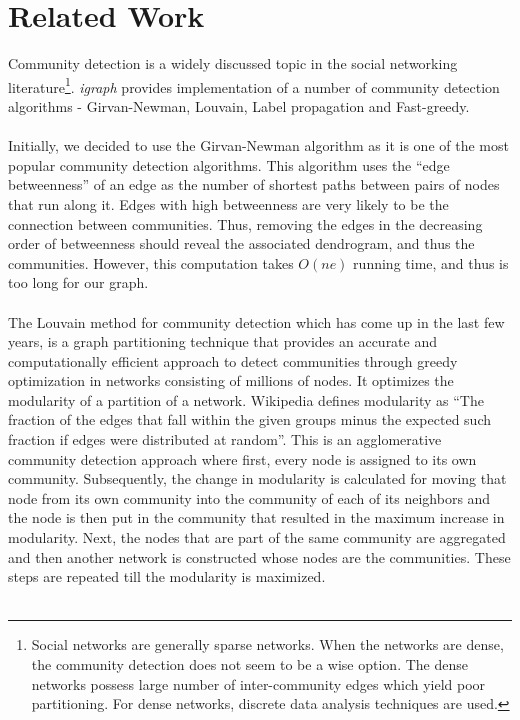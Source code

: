 \documentclass[11pt]{article}
\begin{document}
\section{Related Work}
Community detection is a widely discussed topic in the social networking literature\footnote{Social networks are generally sparse networks. When the networks are dense, the community detection does not seem to be a wise option. The dense networks possess large number of inter-community edges which yield poor partitioning. For dense networks, discrete data analysis techniques are used.}\cite{survey}. {\it igraph}\cite{igraph} provides implementation of a number of community detection algorithms\cite{r-bloggers} - Girvan-Newman, Louvain, Label propagation and Fast-greedy.\\\\
Initially, we decided to use the Girvan-Newman algorithm as it is one of the most popular community detection algorithms\cite{girvan}. This algorithm uses the ``edge betweenness'' of an edge as the number of shortest paths between pairs of nodes that run along it. Edges with high betweenness are very likely to be the connection between communities.
Thus, removing the edges in the decreasing order of betweenness should reveal the associated dendrogram, and thus the communities. However, this computation takes $O(ne)$ running time, and thus is too long for our graph.\\\\
The Louvain\cite{louvain} method for community detection which has come up in the last few years, is a graph partitioning technique that provides an accurate and computationally efficient approach to detect communities through greedy optimization in networks consisting of millions of nodes. It optimizes the modularity of a partition of a network. Wikipedia defines modularity as ``The fraction of the edges that fall within the given groups minus the expected such fraction if edges were distributed at random''. This is an agglomerative community detection approach where first, every node is assigned to its own community. Subsequently, the change in modularity is calculated for moving that node from its own community into the community of each of its neighbors and the node is then put in the community that resulted in the maximum increase in modularity. Next, the nodes that are part of the same community are aggregated  and then another network is constructed whose nodes are the communities. These steps are repeated till the modularity is maximized.\\\\
\end{document}
